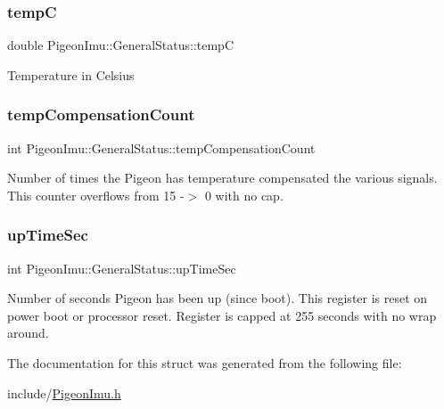\subsubsection{\texorpdfstring{tempC}{tempC}}
{\footnotesize\ttfamily double Pigeon\+Imu\+::\+General\+Status\+::tempC}

Temperature in Celsius \mbox{\label{struct_pigeon_imu_1_1_general_status_aa415234178c327b5d7ac05b80e651c2b}} 
\subsubsection{\texorpdfstring{temp\+Compensation\+Count}{tempCompensationCount}}
{\footnotesize\ttfamily int Pigeon\+Imu\+::\+General\+Status\+::temp\+Compensation\+Count}

Number of times the Pigeon has temperature compensated the various signals. This counter overflows from 15 -\/$>$ 0 with no cap. \mbox{\label{struct_pigeon_imu_1_1_general_status_ab0aa810e7a749e93c4e0167015a1c9cc}} 
\subsubsection{\texorpdfstring{up\+Time\+Sec}{upTimeSec}}
{\footnotesize\ttfamily int Pigeon\+Imu\+::\+General\+Status\+::up\+Time\+Sec}

Number of seconds Pigeon has been up (since boot). This register is reset on power boot or processor reset. Register is capped at 255 seconds with no wrap around. 

The documentation for this struct was generated from the following file\+:\begin{DoxyCompactItemize}
\item 
include/\hyperlink{_pigeon_imu_8h}{Pigeon\+Imu.\+h}\end{DoxyCompactItemize}
